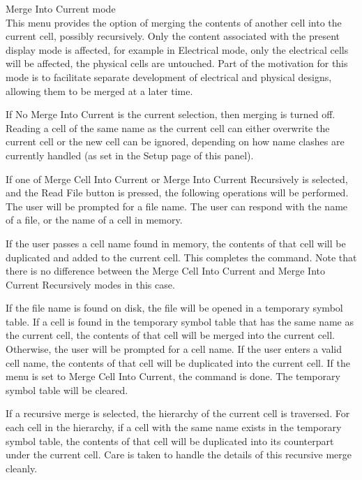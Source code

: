 \begin{description}
\item{\cb Merge Into Current mode}\\
This menu provides the option of merging the contents of another cell
into the current cell, possibly recursively.  Only the content
associated with the present display mode is affected, for example in
Electrical mode, only the electrical cells will be affected, the
physical cells are untouched.  Part of the motivation for this mode is
to facilitate separate development of electrical and physical designs,
allowing them to be merged at a later time.

If {\cb No Merge Into Current} is the current selection, then merging
is turned off.  Reading a cell of the same name as the current cell
can either overwrite the current cell or the new cell can be ignored,
depending on how name clashes are currently handled (as set in the
{\cb Setup} page of this panel).

If one of {\cb Merge Cell Into Current} or {\cb Merge Into Current
Recursively} is selected, and the {\cb Read File} button is pressed,
the following operations will be performed.  The user will be prompted
for a file name.  The user can respond with the name of a file, or the
name of a cell in memory.

If the user passes a cell name found in memory, the contents of that
cell will be duplicated and added to the current cell.  This completes
the command.  Note that there is no difference between the {\cb Merge
Cell Into Current} and {\cb Merge Into Current Recursively} modes in
this case.

If the file name is found on disk, the file will be opened in a
temporary symbol table.  If a cell is found in the temporary symbol
table that has the same name as the current cell, the contents of that
cell will be merged into the current cell.  Otherwise, the user will
be prompted for a cell name.  If the user enters a valid cell name,
the contents of that cell will be duplicated into the current cell. 
If the menu is set to {\cb Merge Cell Into Current}, the command is
done.  The temporary symbol table will be cleared.

If a recursive merge is selected, the hierarchy of the current cell is
traversed.  For each cell in the hierarchy, if a cell with the same
name exists in the temporary symbol table, the contents of that cell
will be duplicated into its counterpart under the current cell.  Care
is taken to handle the details of this recursive merge cleanly.


\end{description}
